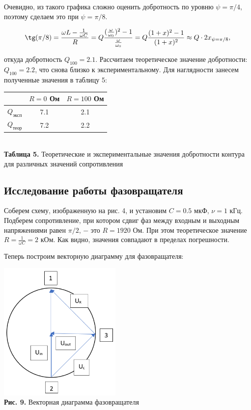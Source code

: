 \documentclass[a4paper,12pt]{article} %
\begin{document}
\hfill \break Очевидно, из такого графика сложно оценить добротность по уровню $\psi = \pi/4$, поэтому сделаем это при $\psi = \pi/8$.

$$
\tg(\pi/8) = \frac{\omega L - \frac{1}{\omega C}}{R} = Q\frac{(\frac{\omega}{\omega_{0}})^2-1}{\frac{\omega}{\omega_{0}}} = Q\frac{(1+x)^2 - 1}{(1+x)^2} \approx Q \cdot 2x_{\psi = \pi/8}, 
$$

\hfill \break откуда добротность $Q_{100} = 2.1$. Рассчитаем теоретическое значение добротности: $Q_{100} = 2.2$, что снова близко к экспериментальному. Для наглядности занесем полученные значения в таблицу 5:

\begin{center}
\begin{tabular}{|c|c|c|}\hline
$  $ & $ R = 0 $ Ом & $ R = 100 $ Ом \\\hline
$ Q_\text{эксп} $ & 7.1 & 2.1 \\\hline
$ Q_\text{теор} $ & 7.2 & 2.2 \\\hline
\end{tabular} \\
\hfill \break \textbf {Таблица 5.} Теоретические и экспериментальные значения добротности контура для различных значений сопротивления\\
\end{center}

\subsection{Исследование работы фазовращателя}
\hfill \break Соберем схему, изображенную на рис. 4, и установим $C = 0.5$ мкФ, $\nu = 1$ кГц. Подберем сопротивление, при котором сдвиг фаз между входным и выходным напряжениями равен $\pi/2$, $-$ это $R = 1920$ Ом. При этом теоретическое значение $R = \frac{1}{\omega C} = 2$ кОм. Как видно, значения совпадают в пределах погрешности.

\hfill \break Теперь построим векторную диаграмму для фазовращателя:

\begin{center}
\includegraphics[width=0.45\textwidth]{3.2.1_9.png}\\
\textbf{Рис. 9.} Векторная диаграмма фазовращателя \\
\end{center}
\end{document}
